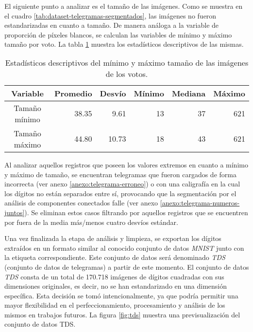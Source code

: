 El siguiente punto a analizar es el tamaño de las imágenes. Como se muestra en el cuadro
\ref{tab:dataset-telegramas-segmentados}, las imágenes no fueron estandarizadas en cuanto a tamaño. De manera análoga a
la variable de proporción de píxeles blancos, se calculan las variables de mínimo y máximo tamaño por voto. La tabla
\ref{tab:describe-min-max-size} muestra los estadísticos descriptivos de las mismas.

\begin{table}[H]
    \centering
    \begin{tabular}{crrrrr}
        \toprule
        Variable      & Promedio & Desvío & Mínimo & Mediana & Máximo \\
        \midrule
        Tamaño mínimo & 38.35    & 9.61   & 13     & 37      & 621    \\
        Tamaño máximo & 44.80    & 10.73  & 18     & 43      & 621    \\
        \bottomrule
    \end{tabular}
    \caption[Estadísticos descriptivos de los dígitos]{Estadísticos descriptivos del mínimo y máximo tamaño de las imágenes de los votos.}
    \label{tab:describe-min-max-size}
\end{table}

Al analizar aquellos registros que poseen los valores extremos en cuanto a mínimo y máximo de tamaño, se encuentran
telegramas que fueron cargados de forma incorrecta (ver anexo \ref{anexo:telegrama-erroneo}) o con una caligrafía en la
cual los dígitos no están separados entre sí, provocando que la segmentación por el análisis de componentes conectados
falle (ver anexo \ref{anexo:telegrama-numeros-juntos}). Se eliminan estos casos filtrando por aquellos registros que se
encuentren por fuera de la media más/menos cuatro desvíos estándar.

Una vez finalizada la etapa de análisis y limpieza, se exportan los dígitos extraídos en un formato similar al conocido
conjunto de datos {\it MNIST} junto con la etiqueta correspondiente. Este conjunto de datos será denominado {\it TDS}
(conjunto de datos de telegramas) a partir de este momento. El conjunto de datos {\it TDS} consta de un total de
170.718 imágenes de dígitos cuadradas con sus dimensiones originales, es decir, no se han estandarizado en una
dimensión específica. Esta decisión se tomó intencionalmente, ya que podría permitir una mayor flexibilidad en el
perfeccionamiento, procesamiento y análisis de los mismos en trabajos futuros. La figura \ref{fig:tds} muestra una
previsualización del conjunto de datos TDS.

